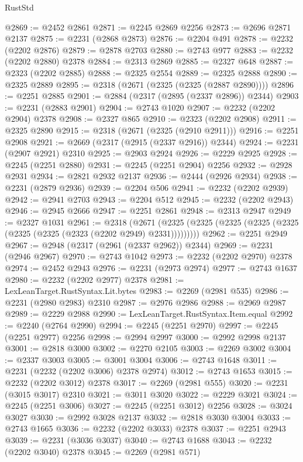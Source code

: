 \begin{lexlean}{RustStd}
\begin{coremodule}
@2869 := @2452 @2861
@2871 := @2245 @2869 @2256
@2873 := @2696 @2871 @2137
@2875 := @2231 (@2868 @2873)
@2876 := @2204 @491
@2878 := @2232 (@2202 @2876)
@2879 := @2878 @2703
@2880 := @2743 @977
@2883 := @2232 (@2202 @2880) @2378
@2884 := @2313 @2869
@2885 := @2327 @648
@2887 := @2323 (@2202 @2885)
@2888 := @2325 @2554
@2889 := @2325 @2888
@2890 := @2325 @2889
@2895 := @2318 (@2671 (@2325 (@2325 (@2887 @2890))))
@2896 := @2251 @2885
@2901 := @2884 (@2317 (@2895 (@2337 @2896)) @2344)
@2903 := @2231 (@2883 @2901)
@2904 := @2743 @1020
@2907 := @2232 (@2202 @2904) @2378
@2908 := @2327 @865
@2910 := @2323 (@2202 @2908)
@2911 := @2325 @2890
@2915 := @2318 (@2671 (@2325 (@2910 @2911)))
@2916 := @2251 @2908
@2921 := @2669 (@2317 (@2915 (@2337 @2916)) @2344)
@2924 := @2231 (@2907 @2921) @2310
@2925 := @2903 @2924
@2926 := @2229 @2925
@2928 := @2245 (@2251 @2880)
@2931 := @2245 (@2251 @2904) @2256
@2932 := @2928 @2931
@2934 := @2821 @2932 @2137
@2936 := @2444 (@2926 @2934)
@2938 := @2231 (@2879 @2936)
@2939 := @2204 @506
@2941 := @2232 (@2202 @2939)
@2942 := @2941 @2703
@2943 := @2204 @512
@2945 := @2232 (@2202 @2943)
@2946 := @2945 @2666
@2947 := @2251 @2861
@2948 := @2313 @2947
@2949 := @2327 @1031
@2961 := @2318
    (@2671 (@2325 (@2325 (@2325 (@2325 (@2325 (@2325 (@2325 (@2323 (@2202 @2949) @2331)))))))))
@2962 := @2251 @2949
@2967 := @2948 (@2317 (@2961 (@2337 @2962)) @2344)
@2969 := @2231 (@2946 @2967)
@2970 := @2743 @1042
@2973 := @2232 (@2202 @2970) @2378
@2974 := @2452 @2943
@2976 := @2231 (@2973 @2974)
@2977 := @2743 @1637
@2980 := @2232 (@2202 @2977) @2378
@2981 := LexLeanTarget.RustSyntax.Lit.bytes
@2983 := @2269 (@2981 @535)
@2986 := @2231 (@2980 @2983) @2310
@2987 := @2976 @2986
@2988 := @2969 @2987
@2989 := @2229 @2988
@2990 := LexLeanTarget.RustSyntax.Item.equal
@2992 := @2240 (@2764 @2990)
@2994 := @2245 (@2251 @2970)
@2997 := @2245 (@2251 @2977) @2256
@2998 := @2994 @2997
@3000 := @2992 @2998 @2137
@3001 := @2818 @3000
@3002 := @2270 @2105
@3003 := @2269 @3002
@3004 := @2337 @3003
@3005 := @3001 @3004
@3006 := @2743 @1648
@3011 := @2231 (@2232 (@2202 @3006) @2378 @2974)
@3012 := @2743 @1653
@3015 := @2232 (@2202 @3012) @2378
@3017 := @2269 (@2981 @555)
@3020 := @2231 (@3015 @3017) @2310
@3021 := @3011 @3020
@3022 := @2229 @3021
@3024 := @2245 (@2251 @3006)
@3027 := @2245 (@2251 @3012) @2256
@3028 := @3024 @3027
@3030 := @2992 @3028 @2137
@3032 := @2818 @3030 @3004
@3033 := @2743 @1665
@3036 := @2232 (@2202 @3033) @2378
@3037 := @2251 @2943
@3039 := @2231 (@3036 @3037)
@3040 := @2743 @1688
@3043 := @2232 (@2202 @3040) @2378
@3045 := @2269 (@2981 @571)

\end{coremodule}
\end{lexlean}

